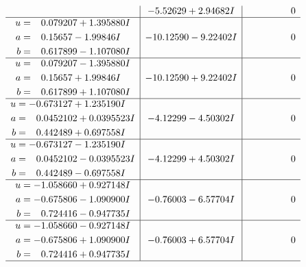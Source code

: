 \documentclass[1p]{elsarticle_modified}
\theoremstyle{definition}
\begin{document}
$$\begin{array}{c|c|c}
 & -5.52629 + 2.94682 I & \phantom{-0.000000 } 0 \\ \hline\begin{aligned}
u &= \phantom{-}0.079207 + 1.395880 I \\
a &= \phantom{-}0.15657 - 1.99846 I \\
b &= \phantom{-}0.617899 - 1.107080 I\end{aligned}
 & -10.12590 - 9.22402 I & \phantom{-0.000000 } 0 \\ \hline\begin{aligned}
u &= \phantom{-}0.079207 - 1.395880 I \\
a &= \phantom{-}0.15657 + 1.99846 I \\
b &= \phantom{-}0.617899 + 1.107080 I\end{aligned}
 & -10.12590 + 9.22402 I & \phantom{-0.000000 } 0 \\ \hline\begin{aligned}
u &= -0.673127 + 1.235190 I \\
a &= \phantom{-}0.0452102 + 0.0395523 I \\
b &= \phantom{-}0.442489 + 0.697558 I\end{aligned}
 & -4.12299 - 4.50302 I & \phantom{-0.000000 } 0 \\ \hline\begin{aligned}
u &= -0.673127 - 1.235190 I \\
a &= \phantom{-}0.0452102 - 0.0395523 I \\
b &= \phantom{-}0.442489 - 0.697558 I\end{aligned}
 & -4.12299 + 4.50302 I & \phantom{-0.000000 } 0 \\ \hline\begin{aligned}
u &= -1.058660 + 0.927148 I \\
a &= -0.675806 - 1.090900 I \\
b &= \phantom{-}0.724416 - 0.947735 I\end{aligned}
 & -0.76003 - 6.57704 I & \phantom{-0.000000 } 0 \\ \hline\begin{aligned}
u &= -1.058660 - 0.927148 I \\
a &= -0.675806 + 1.090900 I \\
b &= \phantom{-}0.724416 + 0.947735 I\end{aligned}
 & -0.76003 + 6.57704 I & \phantom{-0.000000 } 0\\
 \hline 
 \end{array}$$\newpage$$\begin{array}{c|c|c}  

\end{array}$$
\end{document}
